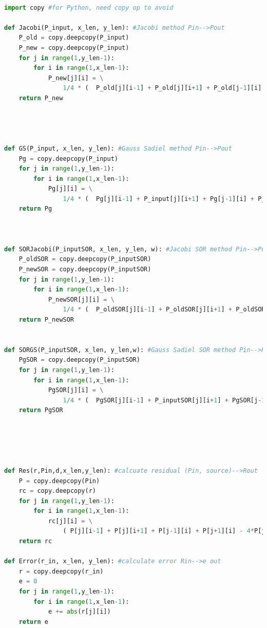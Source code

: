 \documentclass[12pt]{article}
\begin{document}
\begin{scriptsize}
    \begin{lstlisting}[language=python,caption={(4)-The python Source code}]

import copy #for Python, need copy op to avoid 

def Jacobi(P_input, x_len, y_len): #Jacobi method Pin-->Pout
    P_old = copy.deepcopy(P_input)
    P_new = copy.deepcopy(P_input)
    for j in range(1,y_len-1):
        for i in range(1,x_len-1): 
            P_new[j][i] = \
                1/4 * (  P_old[j][i-1] + P_old[j][i+1] + P_old[j-1][i] + P_old[j+1][i] )
    return P_new




def GS(P_input, x_len, y_len): #Gauss Sadiel method Pin-->Pout
    Pg = copy.deepcopy(P_input)
    for j in range(1,y_len-1):
        for i in range(1,x_len-1): 
            Pg[j][i] = \
                1/4 * (  Pg[j][i-1] + P_input[j][i+1] + Pg[j-1][i] + P_input[j+1][i] )
    return Pg



def SORJacobi(P_inputSOR, x_len, y_len, w): #Jacobi SOR method Pin-->Pout
    P_oldSOR = copy.deepcopy(P_inputSOR)
    P_newSOR = copy.deepcopy(P_inputSOR)
    for j in range(1,y_len-1):
        for i in range(1,x_len-1): 
            P_newSOR[j][i] = \
                1/4 * (  P_oldSOR[j][i-1] + P_oldSOR[j][i+1] + P_oldSOR[j-1][i] + P_oldSOR[j+1][i] ) *w + (1-w)*P_oldSOR[j][i]
    return P_newSOR


def SORGS(P_inputSOR, x_len, y_len,w): #Gauss Sadiel SOR method Pin-->Pout
    PgSOR = copy.deepcopy(P_inputSOR)
    for j in range(1,y_len-1):
        for i in range(1,x_len-1): 
            PgSOR[j][i] = \
                1/4 * (  PgSOR[j][i-1] + P_inputSOR[j][i+1] + PgSOR[j-1][i] + P_inputSOR[j+1][i] )*w + (1-w)*P_inputSOR[j][i]
    return PgSOR





def Res(r,Pin,d,x_len,y_len): #calcuate residual (Pin, source)-->Rout
    P = copy.deepcopy(Pin)
    rc = copy.deepcopy(r)
    for j in range(1,y_len-1):
        for i in range(1,x_len-1): 
            rc[j][i] = \
                ( P[j][i-1] + P[j][i+1] + P[j-1][i] + P[j+1][i] - 4*P[j][i] )/(d**2)
    return rc

def Error(r_in, x_len, y_len): #calculate error Rin-->e out
    r = copy.deepcopy(r_in)
    e = 0
    for j in range(1,y_len-1):
        for i in range(1,x_len-1): 
            e += abs(r[j][i])
    return e



\end{lstlisting}
\end{scriptsize}
\end{document}

